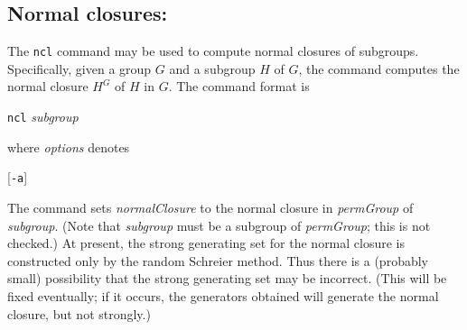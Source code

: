 \subsection{Normal closures:}The {\tt ncl}
command may be used to compute normal closures of subgroups.  Specifically, 
given a group $G$ and a subgroup $H$ of $G$, the command
computes the normal closure $H^G$ of $H$ in $G$.  The command format is
%
\smallskip
\centerline{{\tt ncl}\quad
                        {\it subgroup\/}}
\smallskip
where {\it options\/} denotes
\smallskip
\centerline{
        [{\tt -a}]\enskip
        [{\tt -i}]\enskip
        [{\tt -mb:}$k$]\enskip
        [{\tt -mw:}$w$]\enskip
        [{\tt -n:}{\it name}]\enskip
        [{\tt -p:}{\it path\/}]\enskip
        [{\tt -q}]}
\smallskip
The command sets {\it normalClosure\/}
to the normal closure in {\it permGroup\/} of {\it subgroup}.  (Note that
{\it subgroup\/} must be a subgroup of {\it permGroup\/}; this is not checked.)
\medbreak
At present, the strong generating set for the normal closure is
constructed only by the random Schreier method.  Thus there is a
(probably small) possibility that the strong generating set
may be incorrect.  (This will
be fixed eventually; if it occurs, the generators obtained will generate
the normal closure, but not strongly.)
%
%
%
